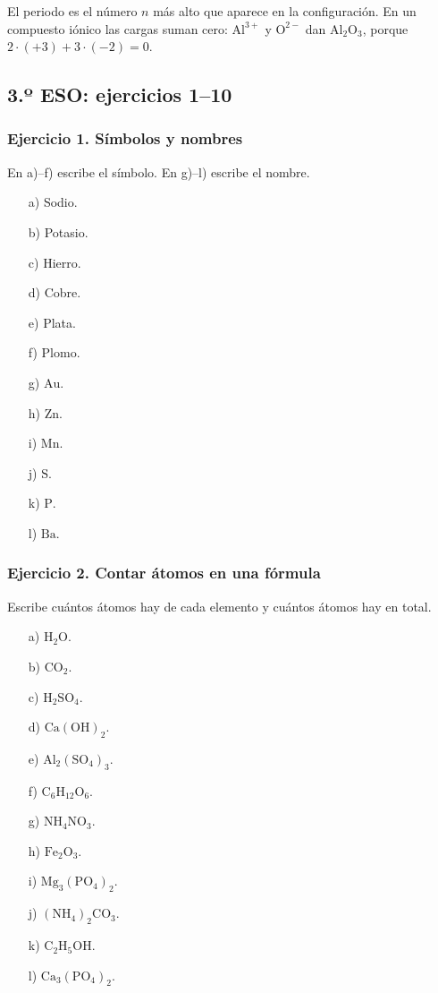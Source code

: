 El periodo es el número $n$ más alto que aparece en la configuración.
En un compuesto iónico las cargas suman cero:
$\mathrm{Al}^{3+}$ y $\mathrm{O}^{2-}$ dan $\mathrm{Al_2O_3}$,
porque $2\cdot(+3)+3\cdot(-2)=0$.

\subsection{3.º ESO: ejercicios 1--10}

\subsubsection*{Ejercicio 1. Símbolos y nombres}

En a)--f) escribe el símbolo. En g)--l) escribe el nombre.

\begin{enumerate}
    \item[a)] Sodio.
    \item[b)] Potasio.
    \item[c)] Hierro.
    \item[d)] Cobre.
    \item[e)] Plata.
    \item[f)] Plomo.
    \item[g)] $\mathrm{Au}$.
    \item[h)] $\mathrm{Zn}$.
    \item[i)] $\mathrm{Mn}$.
    \item[j)] $\mathrm{S}$.
    \item[k)] $\mathrm{P}$.
    \item[l)] $\mathrm{Ba}$.
\end{enumerate}

\subsubsection*{Ejercicio 2. Contar átomos en una fórmula}

Escribe cuántos átomos hay de cada elemento y cuántos átomos hay en total.

\begin{enumerate}
    \item[a)] $\mathrm{H_2O}$.
    \item[b)] $\mathrm{CO_2}$.
    \item[c)] $\mathrm{H_2SO_4}$.
    \item[d)] $\mathrm{Ca(OH)_2}$.
    \item[e)] $\mathrm{Al_2(SO_4)_3}$.
    \item[f)] $\mathrm{C_6H_{12}O_6}$.
    \item[g)] $\mathrm{NH_4NO_3}$.
    \item[h)] $\mathrm{Fe_2O_3}$.
    \item[i)] $\mathrm{Mg_3(PO_4)_2}$.
    \item[j)] $\mathrm{(NH_4)_2CO_3}$.
    \item[k)] $\mathrm{C_2H_5OH}$.
    \item[l)] $\mathrm{Ca_3(PO_4)_2}$.
\end{enumerate}

